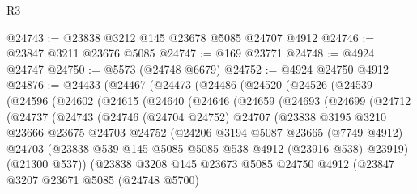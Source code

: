 \begin{lexlean}{R3}
\begin{coremodule}
@24743 := @23838 @3212 @145 @23678 @5085 @24707 @4912
@24746 := @23847 @3211 @23676 @5085
@24747 := @169 @23771
@24748 := @4924 @24747
@24750 := @5573 (@24748 @6679)
@24752 := @4924 @24750 @4912
@24876 := @24433
    (@24467
      (@24473
        (@24486
          (@24520
            (@24526
              (@24539
                (@24596
                  (@24602
                    (@24615
                      (@24640
                        (@24646
                          (@24659
                            (@24693
                              (@24699
                                (@24712
                                  (@24737
                                    (@24743
                                      (@24746
                                        (@24704 @24752)
                                        @24707
                                        (@23838
                                          @3195
                                          @3210
                                          @23666
                                          @23675
                                          @24703
                                          @24752
                                          (@24206
                                            @3194
                                            @5087
                                            @23665
                                            (@7749 @4912)
                                            @24703
                                            (@23838
                                              @539
                                              @145
                                              @5085
                                              @5085
                                              @538
                                              @4912
                                              (@23916 @538)
                                              @23919)
                                            (@21300 @537))
                                          (@23838
                                            @3208
                                            @145
                                            @23673
                                            @5085
                                            @24750
                                            @4912
                                            (@23847
                                              @3207
                                              @23671
                                              @5085
                                              (@24748 @5700)

\end{coremodule}
\end{lexlean}
